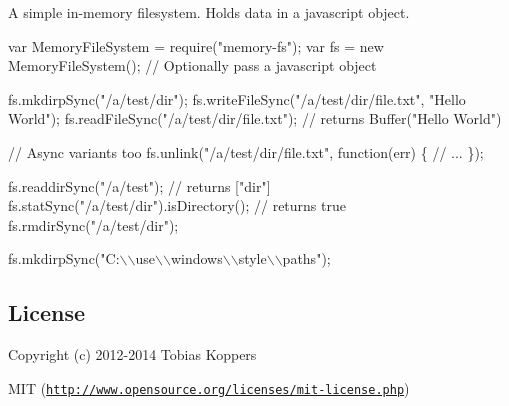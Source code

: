 A simple in-\/memory filesystem. Holds data in a javascript object.


\begin{DoxyCode}
var MemoryFileSystem = require("memory-fs");
var fs = new MemoryFileSystem(); // Optionally pass a javascript object

fs.mkdirpSync("/a/test/dir");
fs.writeFileSync("/a/test/dir/file.txt", "Hello World");
fs.readFileSync("/a/test/dir/file.txt"); // returns Buffer("Hello World")

// Async variants too
fs.unlink("/a/test/dir/file.txt", function(err) \{
    // ...
\});

fs.readdirSync("/a/test"); // returns ["dir"]
fs.statSync("/a/test/dir").isDirectory(); // returns true
fs.rmdirSync("/a/test/dir");

fs.mkdirpSync("C:\(\backslash\)\(\backslash\)use\(\backslash\)\(\backslash\)windows\(\backslash\)\(\backslash\)style\(\backslash\)\(\backslash\)paths");
\end{DoxyCode}


\subsection*{License}

Copyright (c) 2012-\/2014 Tobias Koppers

M\+IT (\href{http://www.opensource.org/licenses/mit-license.php}{\tt http\+://www.\+opensource.\+org/licenses/mit-\/license.\+php}) 